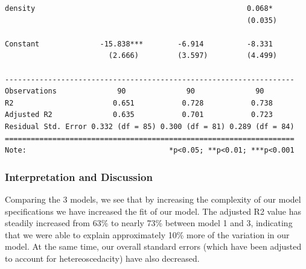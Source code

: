 \documentclass[]{article}
\begin{document}
\begin{verbatim}
density                                                 0.068*     
                                                        (0.035)    
                                                                   
Constant              -15.838***        -6.914          -8.331     
                        (2.666)         (3.597)         (4.499)    
                                                                   
-------------------------------------------------------------------
Observations              90              90              90       
R2                       0.651           0.728           0.738     
Adjusted R2              0.635           0.701           0.723     
Residual Std. Error 0.332 (df = 85) 0.300 (df = 81) 0.289 (df = 84)
===================================================================
Note:                                 *p<0.05; **p<0.01; ***p<0.001
\end{verbatim}

\hypertarget{interpretation-and-discussion}{%
\subsubsection{Interpretation and
Discussion}\label{interpretation-and-discussion}}

Comparing the 3 models, we see that by increasing the complexity of our
model specifications we have increased the fit of our model. The
adjusted R2 value has steadily increased from 63\% to nearly 73\%
between model 1 and 3, indicating that we were able to explain
approximately 10\% more of the variation in our model. At the same time,
our overall standard errors (which have been adjusted to account for
hetereoscedacity) have also decreased.
\end{document}
